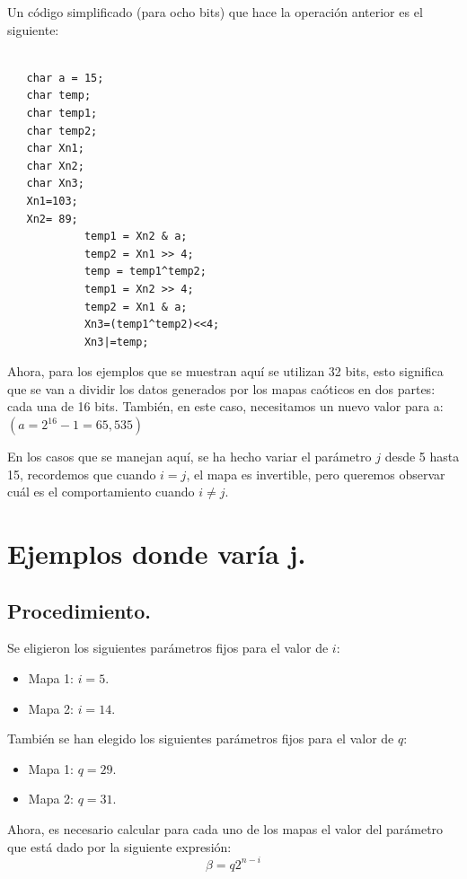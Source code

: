 \documentclass[10pt]{IEEEtran}
\begin{document}
Un código simplificado (para ocho bits) que hace la operación anterior es el siguiente:
\begin{verbatim}

   char a = 15;
   char temp;
   char temp1;
   char temp2;
   char Xn1;
   char Xn2;
   char Xn3;
   Xn1=103;
   Xn2= 89;
            temp1 = Xn2 & a;
            temp2 = Xn1 >> 4;
            temp = temp1^temp2;
            temp1 = Xn2 >> 4;
            temp2 = Xn1 & a;
            Xn3=(temp1^temp2)<<4;
            Xn3|=temp;
\end{verbatim}


Ahora, para los ejemplos que se muestran aquí se utilizan 32 bits, esto significa que se van a dividir los datos generados por los mapas caóticos en dos partes: cada una de 16 bits. También, en este caso, necesitamos un nuevo valor para a: $(a = 2^{16}-1= 65,535)$


En los casos que se manejan aquí, se ha hecho variar el parámetro $j$  desde 5 hasta 15, recordemos que cuando $i=j$, el mapa es invertible, pero queremos observar cuál es el comportamiento cuando $ i \neq j$.




 
\section{Ejemplos donde varía j.}

\subsection{Procedimiento.}
Se eligieron los siguientes parámetros fijos para el valor de $i$:

\begin{itemize}
\item Mapa 1: $i =  5$.
\item Mapa 2: $i = 14$.
\end{itemize}

También se han elegido los siguientes parámetros fijos para el valor de $q$:

\begin{itemize}
\item Mapa 1: $q = 29.$
\item Mapa 2: $q = 31.$
\end{itemize}


Ahora, es necesario calcular para cada uno de los mapas el valor del parámetro que está dado por la siguiente expresión:
\begin{equation}
\beta = q 2^{n-i}
\end{equation}
\end{document}
